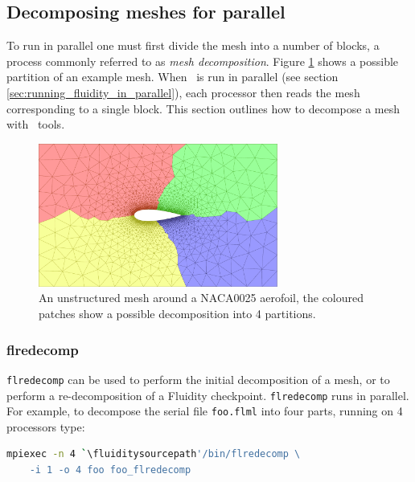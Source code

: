 \subsection{Decomposing meshes for parallel}
\label{decomp_meshes_parallel}
To run in parallel one must first divide the mesh into a number of blocks, a process
commonly referred to as \emph{mesh decomposition}. Figure \ref{fig:NACA0025_mesh_with_partitions}
shows a possible partition of an example mesh. When \fluidity\ is run in parallel (see section
\ref{sec:running_fluidity_in_parallel}), each processor then reads the mesh corresponding to a
single block. This section outlines how to decompose a mesh with \fluidity\ tools.
\begin{figure}[htbp]
 \centering
  \includegraphics[width=0.7\textwidth]{misc_images/NACA0025_mesh_with_partitions.pdf}
  \caption{An unstructured mesh around a NACA0025 aerofoil, the coloured patches show a
           possible decomposition into 4 partitions.}
  \label{fig:NACA0025_mesh_with_partitions}
\end{figure}

\subsubsection{flredecomp}
\label{mesh!meshing tools!flredecomp}
\lstinline[language=bash]+flredecomp+ can be used to perform the initial decomposition of a mesh, or to perform a re-decomposition of a Fluidity checkpoint. \lstinline[language=bash]+flredecomp+ runs in parallel. 
For example, to decompose the serial file \lstinline+foo.flml+
into four parts, running on 4 processors type:

\begin{lstlisting}[language=bash]
mpiexec -n 4 `\fluiditysourcepath'/bin/flredecomp \
    -i 1 -o 4 foo foo_flredecomp
\end{lstlisting}

